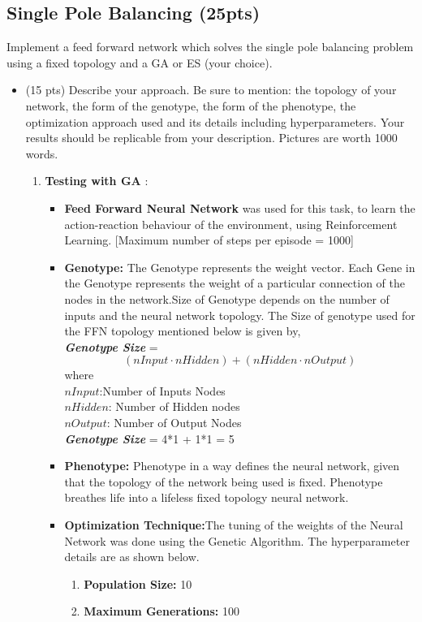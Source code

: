 \documentclass{article}
\begin{document}
\subsection{Single Pole Balancing (25pts)}
Implement a feed forward network which solves the single pole balancing problem using a fixed topology and a GA or ES (your choice).
\begin{itemize}
	\item (15 pts) Describe your approach. Be sure to mention: the topology of your network, the form of the genotype, the form of the phenotype, the optimization approach used and its details including hyperparameters. Your results should be replicable from your description. Pictures are worth 1000 words.
\color{blue}
\begin{enumerate}
	\item \textbf{Testing with GA} :
	\begin{itemize}
	\item \textbf{Feed Forward Neural Network} was used for this task, to learn the action-reaction behaviour of the environment, using Reinforcement Learning. [Maximum number of steps per episode = 1000]
	\item \textbf{Genotype:} The Genotype represents the weight vector. Each Gene in the Genotype represents the weight of a particular connection of the nodes in the network.Size of Genotype depends on the number of inputs and the neural network topology. The Size of genotype used for the FFN topology mentioned below is given by, \\
    \textit{\textbf{Genotype Size}} = $$(nInput \cdot nHidden) + (nHidden \cdot nOutput)$$ where \\$nInput$:Number of Inputs Nodes\\$nHidden$: Number of Hidden nodes\\$nOutput$: Number of Output Nodes\\
	\textbf{\textit{Genotype Size}} = 4*1 + 1*1 = 5
	\item \textbf{Phenotype:} Phenotype in a way defines the neural network, given that the topology of the network being used is fixed. Phenotype breathes life into a lifeless fixed topology neural network.
	\item \textbf{Optimization Technique:}The tuning of the weights of the Neural Network was done using the Genetic Algorithm. The hyperparameter details are as shown below.
	\begin{enumerate}
	\item \textbf{Population Size:} 10
	\item \textbf{Maximum Generations:} 100

\end{enumerate}
\end{itemize}
\end{enumerate}
\end{itemize}
\end{document}

